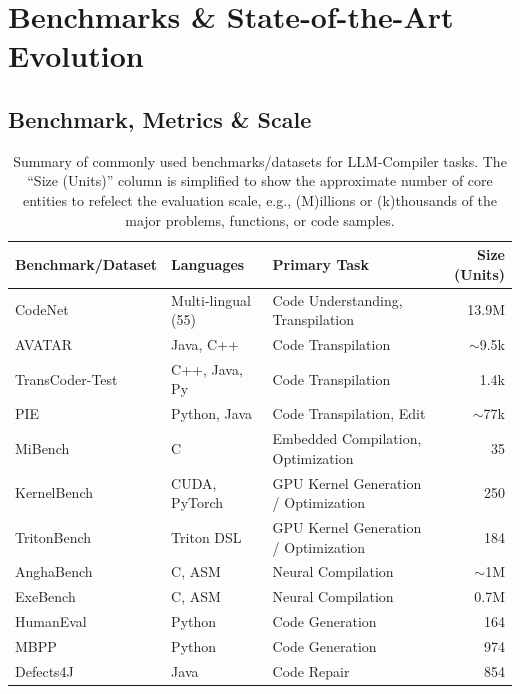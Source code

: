 \documentclass[pdflatex,sn-mathphys-ay,twocolumn, a4paper]{sn-jnl}%
\theoremstyle{thmstyleone}%
\theoremstyle{thmstyletwo}%
\theoremstyle{thmstylethree}%
\begin{document}
\section{Benchmarks \& State-of-the-Art Evolution}
\label{benchmark}

\subsection{Benchmark, Metrics \& Scale}
\label{benchmark_metrics_scale}

\begin{table}[t]
  \centering
  \begin{tabularx}{\textwidth}{|l|l|X|r|}
    \hline
    \textbf{Benchmark/Dataset} & \textbf{Languages} & \textbf{Primary Task} & \textbf{Size (Units)} \\
    \hline
    CodeNet~\citep{codenet} & Multi-lingual (55) & Code Understanding, Transpilation & 13.9M \\
    \hline
    AVATAR~\citep{avatar} & Java, C++ & Code Transpilation & \(\sim\)9.5k \\
    \hline
    TransCoder-Test~\citep{177_transcoder} & C++, Java, Py & Code Transpilation & 1.4k \\
    \hline
    PIE~\citep{pie} & Python, Java & Code Transpilation, Edit & \(\sim\)77k \\
    \hline
    MiBench~\citep{mibench} & C & Embedded Compilation, Optimization & 35 \\
    \hline
    KernelBench~\citep{kernelbench_2025_icml} & CUDA, PyTorch & GPU Kernel Generation / Optimization & 250 \\
    \hline
    TritonBench~\citep{tritonbench_2025_acl} & Triton DSL & GPU Kernel Generation / Optimization & 184 \\
    \hline
    AnghaBench~\citep{anghabench} & C, ASM & Neural Compilation & \(\sim\)1M \\
    \hline
    ExeBench~\citep{exebench_2022_maps} & C, ASM & Neural Compilation & 0.7M \\
    \hline
    HumanEval~\citep{humaneval} & Python & Code Generation & 164 \\
    \hline
    MBPP~\citep{mbpp} & Python & Code Generation & 974 \\
    \hline
    Defects4J~\citep{defects4j} & Java & Code Repair & 854 \\
    \hline
  \end{tabularx}
  \caption{
    Summary of commonly used benchmarks/datasets for LLM-Compiler tasks. 
    The ``Size (Units)'' column is simplified to show the approximate number of core entities to refelect the evaluation scale, 
    e.g., (M)illions or (k)thousands of the major problems, functions, or code samples.}
  \label{tab:benchmarks-summary}
\end{table}
\end{document}
